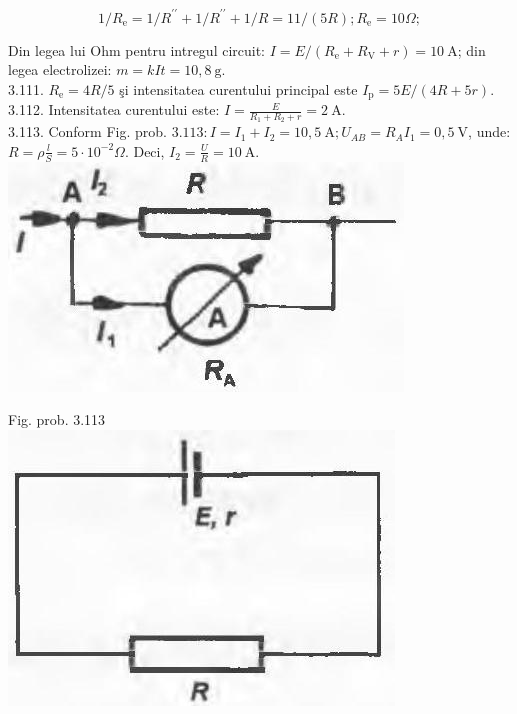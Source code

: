 \documentclass[10pt]{article}
\begin{document}
$$
1 / R_{\mathrm{e}}=1 / R^{\prime \prime}+1 / R^{\prime \prime}+1 / R=11 /(5 R) ; R_{\mathrm{e}}=10 \Omega ;
$$

Din legea lui Ohm pentru intregul circuit: $I=E /\left(R_{\mathrm{e}}+R_{\mathrm{V}}+r\right)=10 \mathrm{~A}$; din legea electrolizei: $m=k I t=10,8 \mathrm{~g}$.\\
3.111. $R_{\mathrm{e}}=4 R / 5$ şi intensitatea curentului principal este $I_{\mathrm{p}}=5 E /(4 R+5 r)$.\\
3.112. Intensitatea curentului este: $I=\frac{E}{R_{1}+R_{2}+r}=2 \mathrm{~A}$.\\
3.113. Conform Fig. prob. $3.113: I=I_{1}+I_{2}=10,5 \mathrm{~A} ; U_{A B}=R_{A} I_{1}=0,5 \mathrm{~V}$, unde: $R=\rho \frac{l}{S}=5 \cdot 10^{-2} \Omega$. Deci, $I_{2}=\frac{U}{R}=10 \mathrm{~A}$.\\
\includegraphics[max width=\textwidth, center]{2025_07_01_5b3ff9fa0d508c8e9f17g-363}

Fig. prob. 3.113\\
\includegraphics[max width=\textwidth, center]{2025_07_01_5b3ff9fa0d508c8e9f17g-363(1)}
\end{document}
